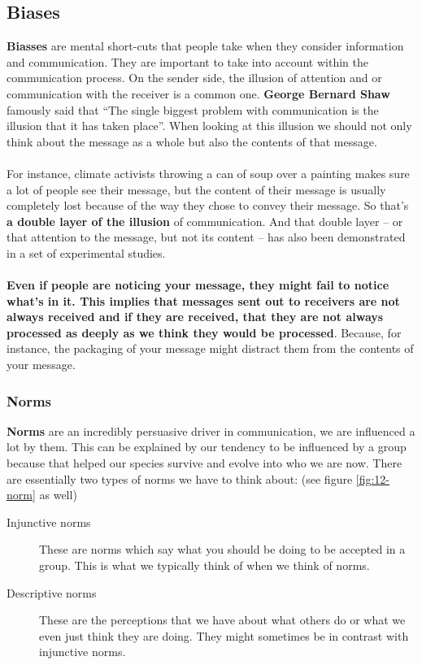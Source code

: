 \documentclass[../summary.tex]{subfiles}
\begin{document}
		\subsection{Biases}
			\textbf{Biasses} are mental short-cuts that people take when they consider information and communication. They are important to take into account within the communication process. On the sender side, the illusion of attention and or communication with the receiver is a common one. \textbf{George Bernard Shaw} famously said that ``The single biggest problem with communication is the illusion that it has taken place''. When looking at this illusion we should not only think about the message as a whole but also the contents of that message.
			\\\\
			For instance, climate activists throwing a can of soup over a painting makes sure a lot of people see their message, but the content of their message is usually completely lost because of the way they chose to convey their message. So that's \textbf{a double layer of the illusion} of communication. And that double layer -- or that attention to the message, but not its content -- has also been demonstrated in a set of experimental studies.
			\\\\
			\textbf{Even if people are noticing your message, they might fail to notice what's in it. This implies that messages sent out to receivers are not always received and if they are received, that they are not always processed as deeply as we think they would be processed}. Because, for instance, the packaging of your message might distract them from the contents of your message.
			
			\newpage
			
			\subsubsection{Norms}
				\textbf{Norms} are an incredibly persuasive driver in communication, we are influenced a lot by them. This can be explained by our tendency to be influenced by a group because that helped our species survive and evolve into who we are now. There are essentially two types of norms we have to think about: (see figure \ref{fig:12-norm} as well)
				\begin{description}
					\item[Injunctive norms] These are norms which say what you should be doing to be accepted in a group. This is what we typically think of when we think of norms.
					\item[Descriptive norms] These are the perceptions that we have about what others do or what we even just think they are doing. They might sometimes be in contrast with injunctive norms. 
				\end{description}
				
\end{document}

